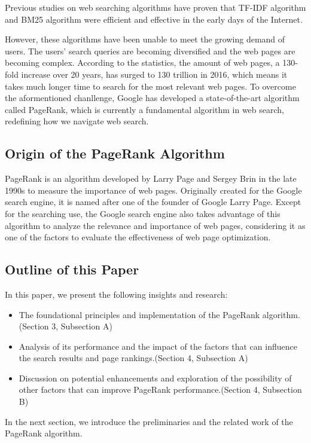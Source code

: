 \documentclass[lettersize,journal,12pt]{IEEEtran}
\begin{document}
Previous studies on web searching algorithms have proven that TF-IDF algorithm and BM25 algorithm were efficient and effective in the early days of the Internet.

However, these algorithms have been unable to meet the growing demand of users.
The users' search queries are becoming diversified and the web pages are becoming complex.
According to the statistics, the amount of web pages, a 130-fold increase over 20 years, has surged to 130 trillion in 2016, which means it takes much longer time to search for the most relevant web pages.
To overcome the aformentioned chanllenge, Google has developed a state-of-the-art algorithm called PageRank, which is currently a fundamental algorithm in web search, redefining how we navigate web search.

\subsection{Origin of the PageRank Algorithm} 
PageRank is an algorithm developed by Larry Page and Sergey Brin in the late 1990s to measure the importance of web pages. 
Originally created for the Google search engine, it is named after one of the founder of Google Larry Page. Except for the searching use, the Google search engine also takes advantage of this algorithm to analyze the relevance and importance of web pages, considering it as one of the factors to evaluate the effectiveness of web page optimization. 

\subsection{Outline of this Paper}

In this paper, we present the following insights and research:
\begin{itemize}
	\item The foundational principles and implementation of the PageRank algorithm.(Section 3, Subsection A)
	\item Analysis of its performance and the impact of the factors that can influence the search results and page rankings.(Section 4, Subsection A)
	\item Discussion on potential enhancements and exploration of the possibility of other factors that can improve PageRank performance.(Section 4, Subsection B)
\end{itemize}

In the next section, we introduce the preliminaries and the related work of the PageRank algorithm.
\end{document}
